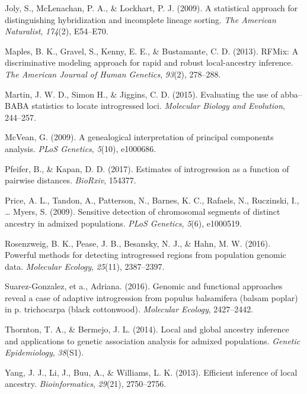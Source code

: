 \documentclass[12pt,twoside]{reedthesis}
\begin{document}
  \hypertarget{ref-joly2009statistical}{}
  Joly, S., McLenachan, P. A., \& Lockhart, P. J. (2009). A statistical
  approach for distinguishing hybridization and incomplete lineage
  sorting. \emph{The American Naturalist}, \emph{174}(2), E54--E70.
  
  \hypertarget{ref-maples2013rfmix}{}
  Maples, B. K., Gravel, S., Kenny, E. E., \& Bustamante, C. D. (2013).
  RFMix: A discriminative modeling approach for rapid and robust
  local-ancestry inference. \emph{The American Journal of Human Genetics},
  \emph{93}(2), 278--288.
  
  \hypertarget{ref-martin2000}{}
  Martin, J. W. D., Simon H., \& Jiggins, C. D. (2015). Evaluating the use
  of abba--BABA statistics to locate introgressed loci. \emph{Molecular
  Biology and Evolution}, 244--257.
  
  \hypertarget{ref-mcvean2009genealogical}{}
  McVean, G. (2009). A genealogical interpretation of principal components
  analysis. \emph{PLoS Genetics}, \emph{5}(10), e1000686.
  
  \hypertarget{ref-pfeifer2017estimates}{}
  Pfeifer, B., \& Kapan, D. D. (2017). Estimates of introgression as a
  function of pairwise distances. \emph{BioRxiv}, 154377.
  
  \hypertarget{ref-price2009sensitive}{}
  Price, A. L., Tandon, A., Patterson, N., Barnes, K. C., Rafaels, N.,
  Ruczinski, I., \ldots{} Myers, S. (2009). Sensitive detection of
  chromosomal segments of distinct ancestry in admixed populations.
  \emph{PLoS Genetics}, \emph{5}(6), e1000519.
  
  \hypertarget{ref-rosenzweig2016powerful}{}
  Rosenzweig, B. K., Pease, J. B., Besansky, N. J., \& Hahn, M. W. (2016).
  Powerful methods for detecting introgressed regions from population
  genomic data. \emph{Molecular Ecology}, \emph{25}(11), 2387--2397.
  
  \hypertarget{ref-suarez2016}{}
  Suarez-Gonzalez, et a., Adriana. (2016). Genomic and functional
  approaches reveal a case of adaptive introgression from populus
  balsamifera (balsam poplar) in p. trichocarpa (black cottonwood).
  \emph{Molecular Ecology}, 2427--2442.
  
  \hypertarget{ref-thornton2014local}{}
  Thornton, T. A., \& Bermejo, J. L. (2014). Local and global ancestry
  inference and applications to genetic association analysis for admixed
  populations. \emph{Genetic Epidemiology}, \emph{38}(S1).
  
  \hypertarget{ref-yang2013efficient}{}
  Yang, J. J., Li, J., Buu, A., \& Williams, L. K. (2013). Efficient
  inference of local ancestry. \emph{Bioinformatics}, \emph{29}(21),
  2750--2756.
  
\end{document}
